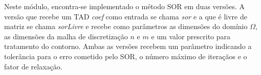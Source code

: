 \documentclass[
	article,			%
	11pt,				%
	oneside,			%
	a4paper,			%
	english,			%
	brazil,				%
	sumario=tradicional
	]{abntex2}
\begin{document}
Neste módulo, encontra-se implementado o método SOR em duas versões. A versão que recebe um TAD \emph{coef} como entrada se chama
\emph{sor} e a que é livre de matriz se chama \emph{sorLivre} e recebe como parâmetros as dimensões do domínio $\Omega$, as dimensões
da malha de discretização $n$ e $m$ e um valor prescrito para tratamento do contorno. Ambas as versões recebem um parâmetro indicando
a tolerância para o erro cometido pelo SOR, o número máximo de iteraçãos e o fator de relaxação.

\postextual







%
%




\end{document}
